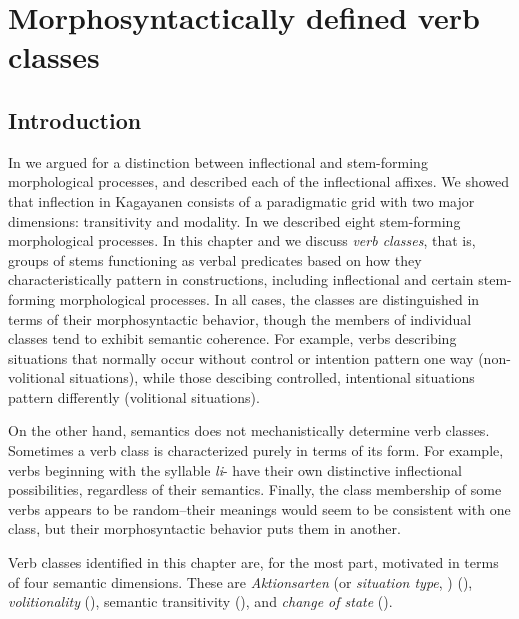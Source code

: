 \chapter{Morphosyntactically defined verb classes}
\label{chap:morphosyntacticallydefinedverbclasses}
\label{chap:verbclasses-1}
\section{Introduction}
\label{sec:introduction-8}

In  we argued for a distinction between inflectional and stem-forming morphological processes, and described each of the inflectional affixes. We showed that inflection in Kagayanen consists of a paradigmatic grid with two major dimensions: transitivity and modality. In  we described eight stem-forming morphological processes. In this chapter and  we discuss \textit{verb classes}, that is, groups of stems functioning as verbal predicates based on how they characteristically pattern in constructions, including inflectional and certain stem-forming morphological processes. In all cases, the classes are distinguished in terms of their morphosyntactic behavior, though the members of individual classes tend to exhibit semantic coherence. For example, verbs describing situations that normally occur without control or intention pattern one way (non-volitional situations), while those descibing controlled, intentional situations pattern differently (volitional situations). 

On the other hand, semantics does not mechanistically determine verb classes. Sometimes a verb class is characterized purely in terms of its form. For example, verbs beginning with the syllable \textit{li}{}- have their own distinctive inflectional possibilities, regardless of their semantics. Finally, the class membership of some verbs appears to be random--their meanings would seem to be consistent with one class, but their morphosyntactic behavior puts them in another.

Verb classes identified in this chapter are, for the most part, motivated in terms of four semantic dimensions. These are \textit{Aktionsarten} (or \textit{situation type}, \citealt{vendler1957}) (), \textit{volitionality} (), semantic transitivity\textit{} (), and \textit{change of state} ().

